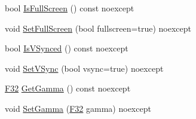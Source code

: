 \begin{DoxyCompactItemize}
\item 
bool \mbox{\hyperlink{classmage_1_1rendering_1_1_display_configuration_a507e755923af2ba1338cc041b5df8e0a}{Is\+Full\+Screen}} () const noexcept
\item 
void \mbox{\hyperlink{classmage_1_1rendering_1_1_display_configuration_a5e15cc1ca56718a7892b80cd0a1d20c0}{Set\+Full\+Screen}} (bool fullscreen=true) noexcept
\item 
bool \mbox{\hyperlink{classmage_1_1rendering_1_1_display_configuration_a6447404f1d720b98b37f684ba0e790a0}{Is\+V\+Synced}} () const noexcept
\item 
void \mbox{\hyperlink{classmage_1_1rendering_1_1_display_configuration_a304a29762afd99caa1672ef6cc259fb3}{Set\+V\+Sync}} (bool vsync=true) noexcept
\item 
\mbox{\hyperlink{namespacemage_aa97e833b45f06d60a0a9c4fc22ae02c0}{F32}} \mbox{\hyperlink{classmage_1_1rendering_1_1_display_configuration_a84dec99b487839003fce7c9704dc031d}{Get\+Gamma}} () const noexcept
\item 
void \mbox{\hyperlink{classmage_1_1rendering_1_1_display_configuration_a1d8d4b2f3b79e53d9b36da3f6a0ddf69}{Set\+Gamma}} (\mbox{\hyperlink{namespacemage_aa97e833b45f06d60a0a9c4fc22ae02c0}{F32}} gamma) noexcept
\end{DoxyCompactItemize}

